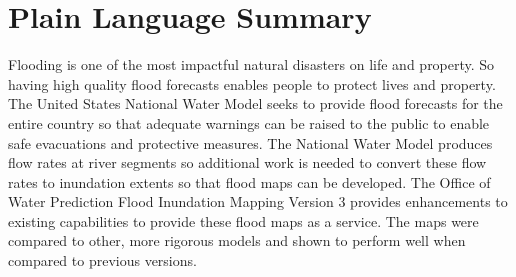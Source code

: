 \section*{Plain Language Summary}
Flooding is one of the most impactful natural disasters on life and property.
So having high quality flood forecasts enables people to protect lives and property.
The United States National Water Model seeks to provide flood forecasts for the entire country so that adequate warnings can be raised to the public to enable safe evacuations and protective measures.
The National Water Model produces flow rates at river segments so additional work is needed to convert these flow rates to inundation extents so that flood maps can be developed.
The Office of Water Prediction Flood Inundation Mapping Version 3 provides enhancements to existing capabilities to provide these flood maps as a service.
The maps were compared to other, more rigorous models and shown to perform well when compared to previous versions.
%
